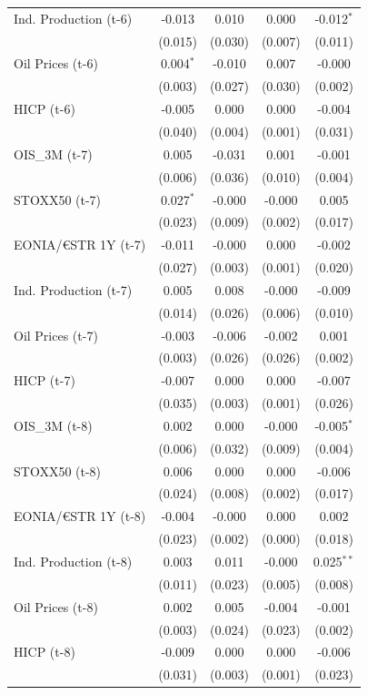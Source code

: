 \begin{longtable}[t]{lcccc}
Ind. Production (t-6) & -0.013 & 0.010 & 0.000 & -0.012$^{*}$\\
 & (0.015) & (0.030) & (0.007) & (0.011)\\
Oil Prices (t-6) & 0.004$^{*}$ & -0.010 & 0.007 & -0.000\\
 & (0.003) & (0.027) & (0.030) & (0.002)\\
HICP (t-6) & -0.005 & 0.000 & 0.000 & -0.004\\
 & (0.040) & (0.004) & (0.001) & (0.031)\\
OIS\_3M (t-7) & 0.005 & -0.031 & 0.001 & -0.001\\
 & (0.006) & (0.036) & (0.010) & (0.004)\\
STOXX50 (t-7) & 0.027$^{*}$ & -0.000 & -0.000 & 0.005\\
 & (0.023) & (0.009) & (0.002) & (0.017)\\
EONIA/€STR 1Y (t-7) & -0.011 & -0.000 & 0.000 & -0.002\\
 & (0.027) & (0.003) & (0.001) & (0.020)\\
Ind. Production (t-7) & 0.005 & 0.008 & -0.000 & -0.009\\
 & (0.014) & (0.026) & (0.006) & (0.010)\\
Oil Prices (t-7) & -0.003 & -0.006 & -0.002 & 0.001\\
 & (0.003) & (0.026) & (0.026) & (0.002)\\
HICP (t-7) & -0.007 & 0.000 & 0.000 & -0.007\\
 & (0.035) & (0.003) & (0.001) & (0.026)\\
OIS\_3M (t-8) & 0.002 & 0.000 & -0.000 & -0.005$^{*}$\\
 & (0.006) & (0.032) & (0.009) & (0.004)\\
STOXX50 (t-8) & 0.006 & 0.000 & 0.000 & -0.006\\
 & (0.024) & (0.008) & (0.002) & (0.017)\\
EONIA/€STR 1Y (t-8) & -0.004 & -0.000 & 0.000 & 0.002\\
 & (0.023) & (0.002) & (0.000) & (0.018)\\
Ind. Production (t-8) & 0.003 & 0.011 & -0.000 & 0.025$^{**}$\\
 & (0.011) & (0.023) & (0.005) & (0.008)\\
Oil Prices (t-8) & 0.002 & 0.005 & -0.004 & -0.001\\
 & (0.003) & (0.024) & (0.023) & (0.002)\\
HICP (t-8) & -0.009 & 0.000 & 0.000 & -0.006\\
 & (0.031) & (0.003) & (0.001) & (0.023)\\

\end{longtable}
